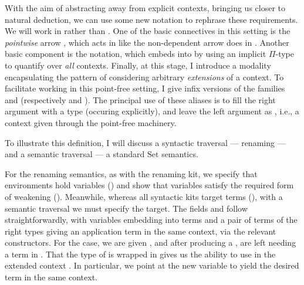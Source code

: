 With the aim of abstracting away from explicit contexts, bringing us closer to
natural deduction, we can use some new notation to rephrase these requirements.
We will work in \AgdaSpace{}\AgdaSymbol{$\to$}\AgdaSpace{}%
 rather than .
One of the basic connectives in this setting is the \emph{pointwise} arrow
\AgdaFunction{\_$\Rightarrow$\_}, which acts in
\AgdaSpace{}\AgdaSymbol{$\to$}\AgdaSpace{}
like the non-dependent arrow does in .
Another basic component is the \AgdaFunction{$\forall[\_]$} notation, which
embeds \AgdaSpace{}\AgdaSymbol{$\to$}\AgdaSpace{}%
 into  by using an implicit $\Pi$-type
to quantify over \emph{all} contexts.
Finally, at this stage, I introduce a modality \AgdaFunction{$\bigcirc$}
encapsulating the pattern of considering arbitrary \emph{extensions} of a
context.
To facilitate working in this point-free setting, I give infix versions of
the families \AgdaBound{$\V$} and \AgdaBound{$\C$} (respectively
\AgdaFunction{\_$\V\vdash$\_} and \AgdaFunction{\_$\C\vdash$\_}).
The principal use of these aliases is to fill the right argument with a type
(occuring explicitly), and leave the left argument as \AgdaFunction{\_}, i.e.,
a context given through the point-free machinery.



To illustrate this definition, I will discuss a syntactic traversal ---
renaming --- and a semantic traversal --- a standard $\mathrm{Set}$ semantics.

For the renaming semantics, as with the renaming kit, we specify that
environments hold variables (\AgdaDatatype{\_$\ni$\_}) and show that variables
satisfy the required form of weakening ().
Meanwhile, whereas all syntactic kits target terms
(\AgdaDatatype{\_$\vdash$\_}), with a semantic traversal we must specify the
target.
The fields  and
 follow straightforwardly, with variables
embedding into terms and a pair of terms of the right types giving an
application term in the same context, via the relevant constructors.
For the  case, we are given
, and after producing a
, are left needing a term in
.
That the type of  is wrapped in \AgdaFunction{$\bigcirc$} gives
us the ability to use  in the extended context
.
In particular, we point at the new variable to yield the desired term in the
same context.


